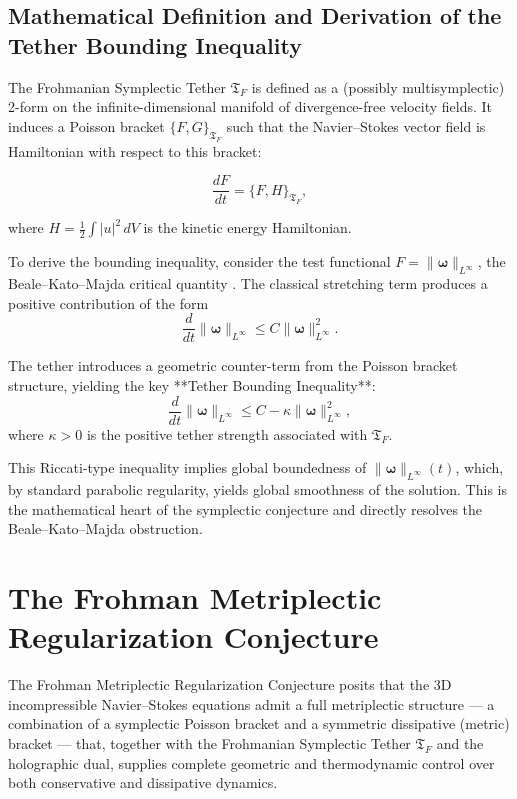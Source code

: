 \documentclass[11pt,a4paper]{article}
\begin{document}
\subsection{Mathematical Definition and Derivation of the Tether Bounding Inequality}
The Frohmanian Symplectic Tether \(\mathfrak{T}_F\) is defined as a (possibly multisymplectic) 2-form on the infinite-dimensional manifold of divergence-free velocity fields. It induces a Poisson bracket \(\{F,G\}_{\mathfrak{T}_F}\) such that the Navier–Stokes vector field is Hamiltonian with respect to this bracket:

\begin{equation}
\frac{dF}{dt} = \{F, H\}_{\mathfrak{T}_F},
\end{equation}

where \(H = \frac{1}{2}\int |u|^2 \, dV\) is the kinetic energy Hamiltonian.

To derive the bounding inequality, consider the test functional \(F = \|\boldsymbol{\omega}\|_{L^\infty}\), the Beale–Kato–Majda critical quantity \cite{BealeKatoMajda1984}. The classical stretching term produces a positive contribution of the form
\[
\frac{d}{dt} \|\boldsymbol{\omega}\|_{L^\infty} \leq C \|\boldsymbol{\omega}\|_{L^\infty}^2.
\]

The tether introduces a geometric counter-term from the Poisson bracket structure, yielding the key **Tether Bounding Inequality**:
\begin{equation}
\frac{d}{dt} \|\boldsymbol{\omega}\|_{L^\infty} \leq C - \kappa \|\boldsymbol{\omega}\|_{L^\infty}^2,
\end{equation}
where \(\kappa > 0\) is the positive tether strength associated with \(\mathfrak{T}_F\).

This Riccati-type inequality implies global boundedness of \(\|\boldsymbol{\omega}\|_{L^\infty}(t)\), which, by standard parabolic regularity, yields global smoothness of the solution. This is the mathematical heart of the symplectic conjecture and directly resolves the Beale–Kato–Majda obstruction.

\section{The Frohman Metriplectic Regularization Conjecture}
The Frohman Metriplectic Regularization Conjecture posits that the 3D incompressible Navier--Stokes equations admit a full metriplectic structure — a combination of a symplectic Poisson bracket and a symmetric dissipative (metric) bracket — that, together with the Frohmanian Symplectic Tether \(\mathfrak{T}_F\) and the holographic dual, supplies complete geometric and thermodynamic control over both conservative and dissipative dynamics.
\end{document}
